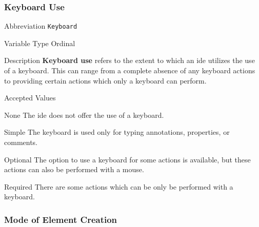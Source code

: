 \subsubsection{Keyboard Use}
\label{subsec:keyboard}

\begin{AlignedDesc}
  \item[Abbreviation] \texttt{Keyboard}

  \item[Variable Type] Ordinal

  \item[Description] \textbf{Keyboard use} refers to the extent to which an \ac{ide} utilizes the use of a keyboard.  This can range from a complete absence of any keyboard actions to providing certain actions which only a keyboard can perform.

  \item[Accepted Values]

  \begin{AlignedDesc}
    \item[None] The \ac{ide} does not offer the use of a keyboard.
		\item[Simple] The keyboard is used only for typing annotations, properties, or comments.
		\item[Optional] The option to use a keyboard for some actions is available, but these actions can also be performed with a mouse.
		\item[Required] There are some actions which can be only be performed with a keyboard.
  \end{AlignedDesc}

\end{AlignedDesc}

\subsubsection{Mode of Element Creation}
\label{subsec:mode}

